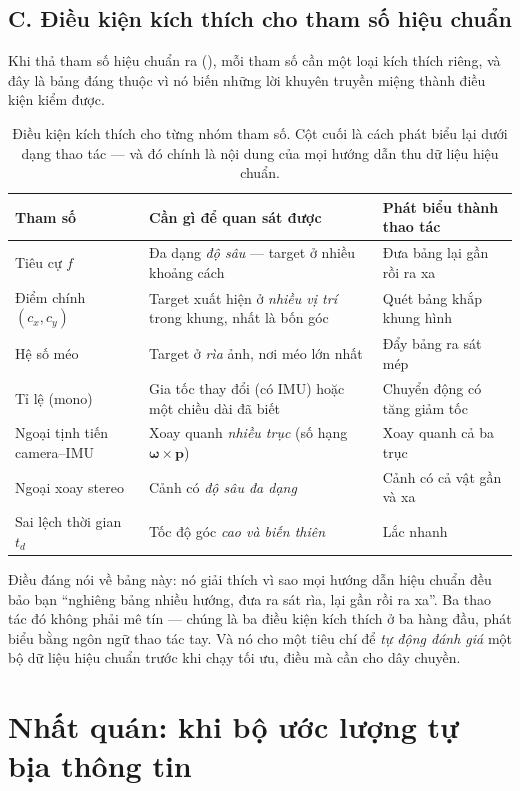\documentclass[../../vslam.tex]{subfiles}
\begin{document}
\subsection{C. Điều kiện kích thích cho tham số hiệu chuẩn}

Khi thả tham số hiệu chuẩn ra (), mỗi tham số cần một loại kích thích riêng, và đây là bảng đáng thuộc vì nó biến những lời khuyên truyền miệng thành điều kiện kiểm được.

\begin{table}[H]\centering\small
\caption{Điều kiện kích thích cho từng nhóm tham số. Cột cuối là cách phát biểu lại dưới dạng thao tác --- và đó chính là nội dung của mọi hướng dẫn thu dữ liệu hiệu chuẩn.}
\label{tab:a05-kichthich}
\begin{tabularx}{\linewidth}{@{}L{2.8cm}YL{3.4cm}@{}}
\toprule
\textbf{Tham số} & \textbf{Cần gì để quan sát được} & \textbf{Phát biểu thành thao tác}\\
\midrule
Tiêu cự \(f\) & Đa dạng \emph{độ sâu} --- target ở nhiều khoảng cách & Đưa bảng lại gần rồi ra xa\\
Điểm chính \((c_x,c_y)\) & Target xuất hiện ở \emph{nhiều vị trí} trong khung, nhất là bốn góc & Quét bảng khắp khung hình\\
Hệ số méo & Target ở \emph{rìa} ảnh, nơi méo lớn nhất & Đẩy bảng ra sát mép\\
Tỉ lệ (mono) & Gia tốc thay đổi (có IMU) hoặc một chiều dài đã biết & Chuyển động có tăng giảm tốc\\
Ngoại tịnh tiến camera--IMU & Xoay quanh \emph{nhiều trục} (số hạng \(\boldsymbol{\omega}\times\mathbf{p}\)) & Xoay quanh cả ba trục\\
Ngoại xoay stereo & Cảnh có \emph{độ sâu đa dạng} & Cảnh có cả vật gần và xa\\
Sai lệch thời gian \(t_d\) & Tốc độ góc \emph{cao và biến thiên} & Lắc nhanh\\
\bottomrule
\end{tabularx}
\end{table}

Điều đáng nói về bảng này: nó giải thích vì sao mọi hướng dẫn hiệu chuẩn đều bảo bạn ``nghiêng bảng nhiều hướng, đưa ra sát rìa, lại gần rồi ra xa''. Ba thao tác đó không phải mê tín --- chúng là ba điều kiện kích thích ở ba hàng đầu, phát biểu bằng ngôn ngữ thao tác tay. Và nó cho một tiêu chí để \emph{tự động đánh giá} một bộ dữ liệu hiệu chuẩn trước khi chạy tối ưu, điều mà  cần cho dây chuyền.

\section{Nhất quán: khi bộ ước lượng tự bịa thông tin}
\end{document}
